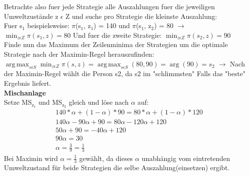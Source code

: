 \documentclass[11pt]{article}
\DeclareMathOperator*{\argmax}{arg\,max}
\begin{document}
Betrachte also fuer jede Strategie alle Auszahlungen fuer die jeweiligen Umweltzustände z \(\epsilon\) Z und suche pro Strategie die kleinste Auszahlung:\\
Fuer s\(_{\text{1}}\) beispielsweise: \(\pi\)(s\(_{\text{1}}\), z\(_{\text{1}}\)) = 140 und \(\pi\)(s\(_{\text{1}}\), z\(_{\text{2}}\)) = 80 \(\rightarrow\) 
\(\displaystyle \min_{z \epsilon Z} \pi(s_1,z) = 80\)
\newline
Und fuer die zweite Strategie: \(\displaystyle \min_{z \epsilon Z} \pi(s_2,z) = 90\)
\newline
Finde nun das Maximum der Zeilenminima der Strategien um die optimale Strategie nach der Maximin-Regel herauszufinden:
\(\displaystyle \argmax_{s \epsilon S}\min_{z \epsilon Z} \pi(s,z) = \argmax_{s \epsilon S}(80,90) = \arg(90) = s_2\)
\newline
\(\rightarrow\) Nach der Maximin-Regel wählt die Person s2, da s2 im "schlimmsten" Falls das "beste" Ergebnis liefert.\\

 \textbf{Mischanlage}\\
Setze MS\(_{\text{z}_{\text{1}}}\) und MS\(_{\text{z}_{\text{2}}}\) gleich und löse nach \(\alpha\) auf:\\
\begin{equation*}
\begin{aligned}
&140*\alpha + (1-\alpha)*90 = 80*\alpha + (1-\alpha)*120\\
&140\alpha - 90\alpha + 90 = 80\alpha - 120\alpha +120\\
&50\alpha + 90 = -40 \alpha + 120\\
&90\alpha = 30\\
&\alpha = \frac{3}{9} = \frac{1}{3}
\end{aligned}
\end{equation*}
Bei Maximin wird \(\alpha = \frac{1}{3}\) gewählt, da dieses \(\alpha\) unabhängig vom eintretenden Umweltzustand für beide Strategien die selbe Auszahlung(einsetzen) ergibt.
\newline
\end{document}

